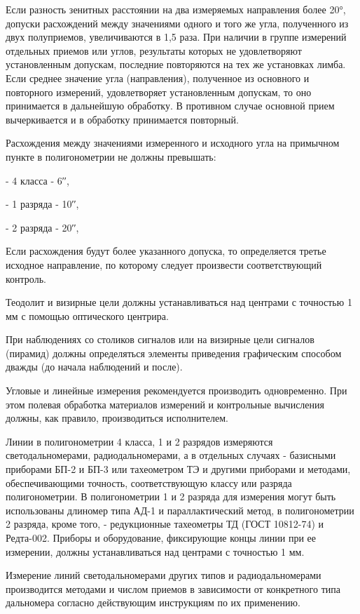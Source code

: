 \documentclass[a4paper]{article}
\begin{document}
\begin{newpage}
{        \par Если разность зенитных расстоянии на два измеряемых направления более 20°, допуски расхождений между значениями одного и того же угла, полученного из двух полуприемов, увеличиваются в 1,5 раза. При наличии в группе измерений отдельных приемов или углов, результаты которых не удовлетворяют установленным допускам, последние повторяются на тех же установках лимба. Если среднее значение угла (направления), полученное из основного и повторного измерений, удовлетворяет установленным допускам, то оно принимается в дальнейшую обработку. В противном случае основной прием вычеркивается и в обработку принимается повторный.
        \par Расхождения между значениями измеренного и исходного угла на примычном пункте в полигонометрии не должны превышать:
        \par - 4 класса - 6′′,
        \par - 1 разряда - 10′′,
        \par - 2 разряда - 20′′,
        \par Если расхождения будут более указанного допуска, то определяется третье исходное направление, по которому следует произвести соответствующий контроль.
        \par Теодолит и визирные цели должны устанавливаться над центрами с точностью 1 мм с помощью оптического центрира.
        \par При наблюдениях со столиков сигналов или на визирные цели сигналов (пирамид) должны определяться элементы приведения графическим способом дважды (до начала наблюдений и после).
        \par Угловые и линейные измерения рекомендуется производить одновременно. При этом полевая обработка материалов измерений и контрольные вычисления должны, как правило, производиться исполнителем.
        \par Линии в полигонометрии 4 класса, 1 и 2 разрядов измеряются светодальномерами, радиодальномерами, а в отдельных случаях - базисными приборами БП-2 и БП-3 или тахеометром ТЭ и другими приборами и методами, обеспечивающими точность, соответствующую классу или разряда полигонометрии. В полигонометрии 1 и 2 разряда для измерения могут быть использованы длиномер типа АД-1 и параллактический метод, в полигонометрии 2 разряда, кроме того, - редукционные тахеометры ТД (ГОСТ 10812-74) и Редта-002. Приборы и оборудование, фиксирующие концы линии при ее измерении, должны устанавливаться над центрами с точностью 1 мм.
        \par Измерение линий светодальномерами других типов и радиодальномерами производится методами и числом приемов в зависимости от конкретного типа дальномера согласно действующим инструкциям по их применению.
}
\end{newpage}
\end{document}

